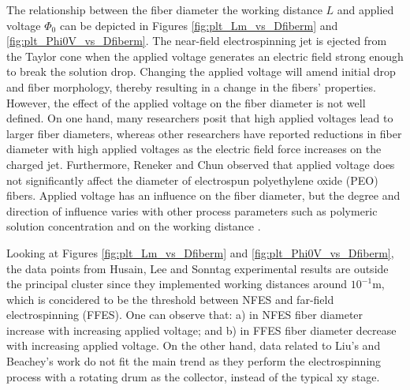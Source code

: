 The relationship between the fiber diameter the working distance $L$ and applied voltage $\Phi_0$ can be depicted in Figures \ref{fig:plt_Lm_vs_Dfiberm} and \ref{fig:plt_Phi0V_vs_Dfiberm}. The near-field electrospinning jet is ejected from the Taylor cone when the applied voltage generates an electric field strong enough to break the solution drop. Changing the applied voltage will amend initial drop and fiber morphology, thereby resulting in a change in the fibers' properties. However, the effect of the applied voltage on the fiber diameter is not well defined. On one hand, many researchers posit that high applied voltages lead to larger fiber diameters, whereas other researchers have reported reductions in fiber diameter with high applied voltages as the electric field force increases on the charged jet. \cite{Zhang2005} Furthermore, Reneker and Chun observed that applied voltage does not significantly affect the diameter of electrospun polyethylene oxide (PEO) fibers. \cite{Reneker1996} Applied voltage has an influence on the fiber diameter, but the degree and direction of influence varies with other process parameters such as polymeric solution concentration and on the working distance \cite{Yordem2008, Chang2016}.

Looking at Figures \ref{fig:plt_Lm_vs_Dfiberm} and \ref{fig:plt_Phi0V_vs_Dfiberm}, the data points from Husain, Lee and Sonntag \cite{Husain2016, Lee2012, Sonntag2020} experimental results are outside the principal cluster since they implemented working distances around $10^{-1} \textrm{m}$, which is concidered to be the threshold between NFES and far-field electrospinning (FFES). One can observe that: a) in NFES fiber diameter increase with increasing applied voltage; and b) in FFES fiber diameter decrease with increasing applied voltage. On the other hand, data related to Liu's and Beachey's work \cite{Liu2014, Beachley2011} do not fit the main trend as they perform the electrospinning process with a rotating drum as the collector, instead of the typical xy stage. 

